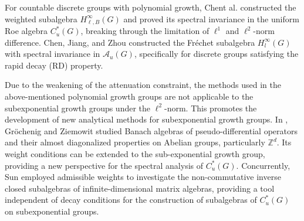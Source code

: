\documentclass[preprint,11pt]{elsarticle}
\numberwithin{equation}{section}
\begin{document}
	For countable discrete groups with polynomial growth, Chent al. \cite{CWW2015} constructed the weighted subalgebra $H_{\ell,B}^{\infty}(G)$ and proved its spectral invariance in the uniform Roe algebra  \( C_u^*(G) \), breaking through the limitation of $\ell^1$ and $\ell^2$-norm difference. Chen, Jiang, and Zhou \cite{CJZ2017} constructed the Fr\'{e}chet subalgebra \( H^\infty_l(G) \) with spectral invariance in \( \mathcal{A}_u(G) \), specifically for discrete groups satisfying the rapid decay (RD) property. 
	
	Due to the weakening of the attenuation constraint, the methods used in the above-mentioned polynomial growth groups are not applicable to the subexponential growth groups under the $\ell^2$-norm. This promotes the development of new analytical methods for subexponential growth groups.
	In \cite{KB2007}, Gr\"{o}chenig and Ziemowit studied Banach algebras of pseudo-differential operators and their almost diagonalized properties on Abelian groups, particularly $\mathbb{Z}^d$. Its weight conditions can be extended to the sub-exponential growth group, providing a new perspective for the spectral analysis of \( C_u^*(G) \).
	Concurrently, Sun \cite{S2007,S2011} employed admissible weights to investigate  the non-commutative inverse closed subalgebras of infinite-dimensional matrix algebras, providing a tool independent of decay conditions for the construction of subalgebras of  \( C_u^*(G) \) on subexponential groups.
	
\end{document}
